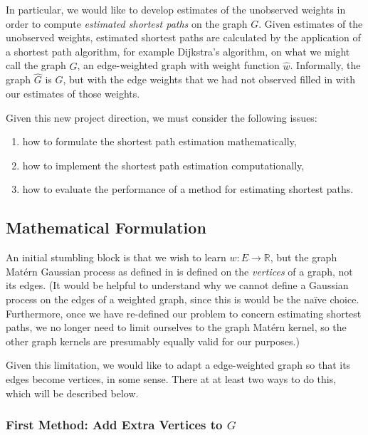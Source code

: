 In particular, we would like to develop estimates of the unobserved weights in order to compute \textit{estimated shortest paths} on the graph $G$. Given estimates of the unobserved weights, estimated shortest paths are calculated by the application of a shortest path algorithm, for example Dijkstra's algorithm, on what we might call the graph $\hat G$, an edge-weighted graph with weight function $\hat w$. Informally, the graph $\hat G$ is $G$, but with the edge weights that we had not observed filled in with our estimates of those weights.

Given this new project direction, we must consider the following issues:

\begin{enumerate}
    \item how to formulate the shortest path estimation mathematically,
    \item how to implement the shortest path estimation computationally,
    \item how to evaluate the performance of a method for estimating shortest paths.
\end{enumerate}

\subsection{Mathematical Formulation}

An initial stumbling block is that we wish to learn $w \colon E \to \mathbb R$, but the graph Mat\'{e}rn Gaussian process as defined in \cite{pmlr-v130-borovitskiy21a} is defined on the \textit{vertices} of a graph, not its edges. (It would be helpful to understand why we cannot define a Gaussian process on the edges of a weighted graph, since this is would be the na\"{i}ve choice. Furthermore, once we have re-defined our problem to concern estimating shortest paths, we no longer need to limit ourselves to the graph Mat\'{e}rn kernel, so the other graph kernels are presumably equally valid for our purposes.)

Given this limitation, we would like to adapt a edge-weighted graph so that its edges become vertices, in some sense. There at at least two ways to do this, which will be described below.

\subsubsection{First Method: Add Extra Vertices to \texorpdfstring{$G$}{G}}

